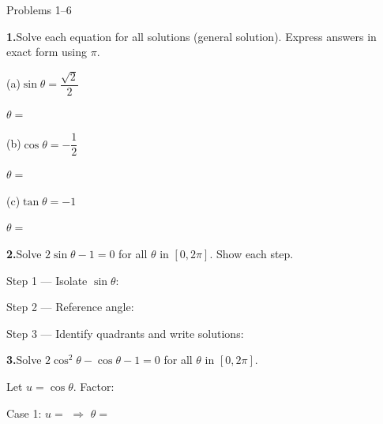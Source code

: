 \documentclass[10pt]{article}
\begin{document}
\namedateperiod

\vspace{0.10in}

\begin{notesbox}{Problems 1--6}

\textbf{1.}\quad Solve each equation for all solutions (general solution).
Express answers in exact form using $\pi$.

\vspace{4pt}
(a)\quad $\sin\theta = \dfrac{\sqrt{2}}{2}$

\vspace{0.12in}
$\theta = $ 

\vspace{8pt}
(b)\quad $\cos\theta = -\dfrac{1}{2}$

\vspace{0.12in}
$\theta = $ 

\vspace{8pt}
(c)\quad $\tan\theta = -1$

\vspace{0.12in}
$\theta = $ 

\vspace{0.14in}
\textbf{2.}\quad Solve $2\sin\theta - 1 = 0$ for all $\theta$ in $[0, 2\pi]$.
Show each step.

\vspace{4pt}
Step 1 --- Isolate $\sin\theta$: 

\vspace{4pt}
Step 2 --- Reference angle: 

\vspace{4pt}
Step 3 --- Identify quadrants and write solutions:

\vspace{0.14in}
\textbf{3.}\quad Solve $2\cos^2\theta - \cos\theta - 1 = 0$ for all $\theta$
in $[0, 2\pi]$.

\vspace{4pt}
Let $u = \cos\theta$. Factor: 

\vspace{4pt}
Case 1: $u = $  $\Rightarrow$ $\theta = $ 


\end{notesbox}
\end{document}
